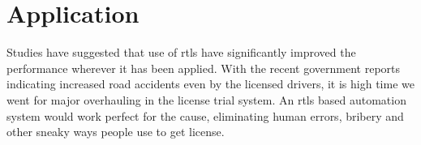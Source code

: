 \section{Application}
Studies have suggested that use of \gls{rtls} have significantly improved\cite{Improvement} the performance wherever it has been applied. With the recent government reports indicating increased road accidents even by the licensed drivers, it is high time we went for major overhauling in the license trial system. An \gls{rtls} based automation system would work perfect for the cause, eliminating human errors, bribery and other sneaky ways people use to get license.

